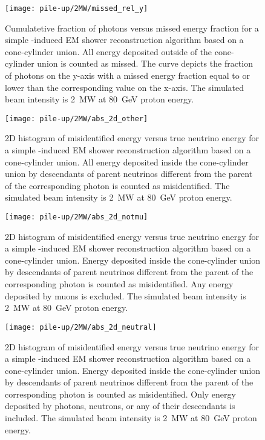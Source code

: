 \begin{figure}[htb]
	\centering
	\texttt{[image: pile-up/2MW/missed\_rel\_y]}
	\caption{Cumulatetive fraction of photons versus missed energy fraction for a simple \Pgpz-induced EM shower reconstruction algorithm based on a cone-cylinder union.
		All energy deposited outside of the cone-cylinder union is counted as missed.
		The curve depicts the fraction of photons on the y-axis with a missed energy fraction equal to or lower than the corresponding value on the x-axis.
		The simulated beam intensity is \SI{2}{\mega\watt} at \SI{80}{\giga\electronvolt} proton energy.}
\end{figure}

\begin{figure}[htb]
	\centering
	\texttt{[image: pile-up/2MW/abs\_2d\_other]}
	\caption{2D histogram of misidentified energy versus true neutrino energy for a simple \Pgpz-induced EM shower reconstruction algorithm based on a cone-cylinder union.
		All energy deposited inside the cone-cylinder union by descendants of parent neutrinos different from the parent of the corresponding \Pgpz photon is counted as misidentified.
		The simulated beam intensity is \SI{2}{\mega\watt} at \SI{80}{\giga\electronvolt} proton energy.}
\end{figure}

\begin{figure}[htb]
	\centering
	\texttt{[image: pile-up/2MW/abs\_2d\_notmu]}
	\caption{2D histogram of misidentified energy versus true neutrino energy for a simple \Pgpz-induced EM shower reconstruction algorithm based on a cone-cylinder union.
		Energy deposited inside the cone-cylinder union by descendants of parent neutrinos different from the parent of the corresponding \Pgpz photon is counted as misidentified.
		Any energy deposited by muons is excluded.
		The simulated beam intensity is \SI{2}{\mega\watt} at \SI{80}{\giga\electronvolt} proton energy.}
\end{figure}

\begin{figure}[htb]
	\centering
	\texttt{[image: pile-up/2MW/abs\_2d\_neutral]}
	\caption{2D histogram of misidentified energy versus true neutrino energy for a simple \Pgpz-induced EM shower reconstruction algorithm based on a cone-cylinder union.
		Energy deposited inside the cone-cylinder union by descendants of parent neutrinos different from the parent of the corresponding \Pgpz photon is counted as misidentified.
		Only energy deposited by photons, neutrons, or any of their descendants is included.
		The simulated beam intensity is \SI{2}{\mega\watt} at \SI{80}{\giga\electronvolt} proton energy.}
\end{figure}

